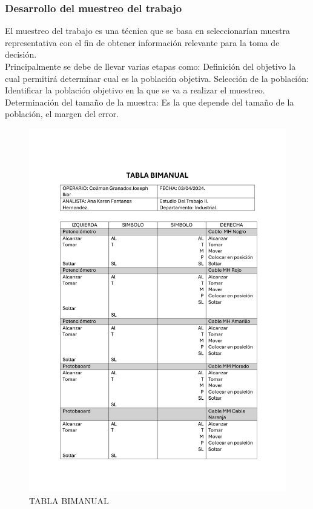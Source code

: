     \subsubsection{Desarrollo del muestreo del trabajo}
    El muestreo del trabajo es una técnica que se basa en seleccionarían muestra representativa con el fin de obtener información relevante para la toma de decisión.\\ 
    Principalmente se debe de llevar varias etapas como: Definición del objetivo la cual permitirá determinar cual es la población objetiva.
    Selección de la población: Identificar la población objetivo en la que se va a realizar el muestreo.
    Determinación del tamaño de la muestra: Es la que depende del tamaño de la población, el margen del error.
    \begin{figure}[H]
        \centering
        \includegraphics[trim = {20mm 82mm 20mm 25mm},clip,scale=0.45]{9/Img/tablaBimanual.pdf}
        \caption{TABLA BIMANUAL }
        \label{fig:bimanual}
    \end{figure}
